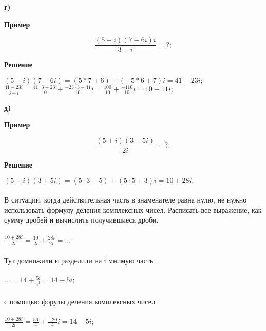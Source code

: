 \documentclass[12pt]{article}
\begin{document}
\newpage
\textbf{г)}\\
\begin{center}\textbf{Пример}\end{center}
$$
\frac{(5+i)(7-6i)i}{3+i} = ?;
$$
\begin{center}\textbf{Решение}\end{center}
$(5+i)(7-6i)=(5*7+6)+(-5*6+7)i=41-23i;$\\
$
\displaystyle
\frac{41-23i}{3+i}=
\frac{41\cdot3-23}{10}+\frac{-23\cdot3-41}{10}i=
\frac{100}{10}+\frac{-110}{10}i=
10-11i;
$

\newpage

\textbf{д)}\\
\begin{center}\textbf{Пример}\end{center}
$$
\frac{(5+i)(3+5i)}{2i}=?;
$$
\begin{center}\textbf{Решение}\end{center}
$(5+i)(3+5i)=(5\cdot3-5)+(5\cdot5 + 3)i=10+28i;$\\
\\
В ситуации, когда действительная часть в знаменателе равна нулю,
не нужно использовать формулу деления комплексных чисел.
Расписать все выражение, как сумму дробей и вычислить получившиеся дроби.\\
\\
$
\displaystyle
\frac{10+28i}{2i}=
\frac{10}{2i}+
\frac{28i}{2i}=...
$\\
\\
Тут домножили и разделили на i мнимую часть\\
\\
$ 
\displaystyle
...=14 + \frac{5i}{i^2} = 14-5i;
$\\
\\
с помощью форулы деления комплексных чисел\\
\\
$
\displaystyle
\frac{10+28i}{2i}=
\frac{56}{4}+
\frac{-20}{4}i=
14-5i;
$
\end{document}
